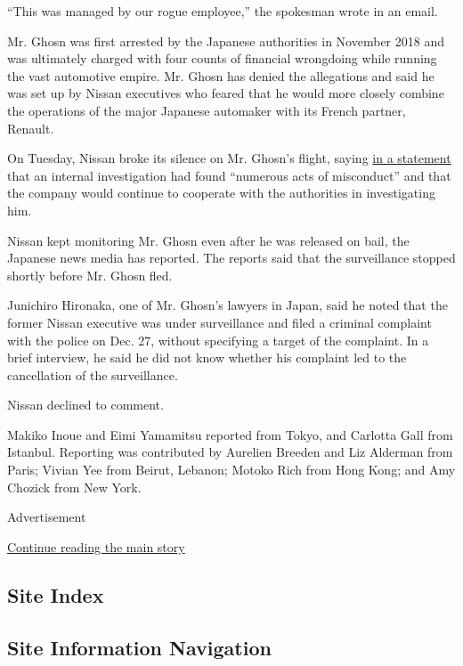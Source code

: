 ``This was managed by our rogue employee,'' the spokesman wrote in an
email.

Mr. Ghosn was first arrested by the Japanese authorities in November
2018 and was ultimately charged with four counts of financial wrongdoing
while running the vast automotive empire. Mr. Ghosn has denied the
allegations and said he was set up by Nissan executives who feared that
he would more closely combine the operations of the major Japanese
automaker with its French partner, Renault.

On Tuesday, Nissan broke its silence on Mr. Ghosn's flight, saying
\href{https://global.nissannews.com/en/releases/200107-00-e}{in a
statement} that an internal investigation had found ``numerous acts of
misconduct'' and that the company would continue to cooperate with the
authorities in investigating him.

Nissan kept monitoring Mr. Ghosn even after he was released on bail, the
Japanese news media has reported. The reports said that the surveillance
stopped shortly before Mr. Ghosn fled.

Junichiro Hironaka, one of Mr. Ghosn's lawyers in Japan, said he noted
that the former Nissan executive was under surveillance and filed a
criminal complaint with the police on Dec. 27, without specifying a
target of the complaint. In a brief interview, he said he did not know
whether his complaint led to the cancellation of the surveillance.

Nissan declined to comment.

Makiko Inoue and Eimi Yamamitsu reported from Tokyo, and Carlotta Gall
from Istanbul. Reporting was contributed by Aurelien Breeden and Liz
Alderman from Paris; Vivian Yee from Beirut, Lebanon; Motoko Rich from
Hong Kong; and Amy Chozick from New York.

Advertisement

\protect\hyperlink{after-bottom}{Continue reading the main story}

\hypertarget{site-index}{%
\subsection{Site Index}\label{site-index}}

\hypertarget{site-information-navigation}{%
\subsection{Site Information
Navigation}\label{site-information-navigation}}

